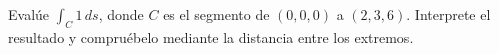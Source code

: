 Evalúe $\int_C1\,ds$, donde $C$ es el segmento de $(0,0,0)$ a $(2,3,6)$. Interprete el resultado y compruébelo mediante la distancia entre los extremos.
